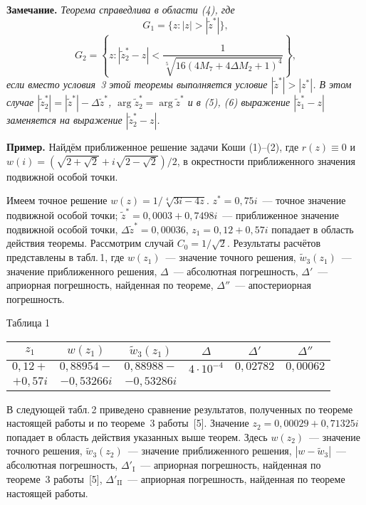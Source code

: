 \textbf{Замечание.} {\it Теорема справедлива в области (4), где
$$
G_{1} = \{ z\colon |z|> |\tilde z^{*}| \},
$$
$$
G_{2} = \left\{ z\colon |\tilde z_{2}^{*} -z| < \frac{1 }{\sqrt[\scriptstyle5]{16(4M_{7}+4\Delta
M_{2}+1)^{4}} } \right\},
$$
если вместо условия~3 этой теоремы выполняется условие $|\tilde z^{*}|> |z^{*}|$. В этом случае $|\tilde
z_{2}^{*}| = |\tilde z^{*}|- \Delta \tilde z^{*}$, $\arg \tilde z_{2}^{*} = \arg \tilde z^{*}$ и в (5), (6)
выражение $|\tilde z_{1}^{*}-z|$ заменяется на выражение $|\tilde z_{2}^{*}-z|$.}

\textbf{Пример.} Найдём приближенное решение задачи Коши (1)--(2), где $r(z)\equiv 0$ и $w(i) =
(\sqrt{2+\sqrt2}+i\sqrt{2-\sqrt2})/2$, в окрестности приближенного значения подвижной особой точки.

Имеем точное решение $w(z) = 1/\sqrt[\scriptstyle4]{3i-4z}$. $z^{*} = 0,75i$~--- точное значение подвижной
особой точки; $\tilde z^{*} = 0,0003+ 0,7498i$~--- приближенное значение подвижной особой точки, $\Delta
\tilde z^{*} = 0,00036$, $z_{1} = 0,12+0,57i$ попадает в область действия теоремы. Рассмотрим случай
$C_{0}=1/\sqrt2$. Результаты расчётов представлены в табл.\,1, где $w(z_{1})$~--- значение точного решения,
$\tilde w_{3}(z_{1})$~--- значение приближенного решения, $\Delta$~--- абсолютная погрешность, $\Delta'$~---
априорная погрешность, найденная по теореме, $\Delta''$~--- апостериорная погрешность.

\begin{table}[tb]
\footnotesize

{\raggedleft Таблица 1

}

\smallskip

{\tabcolsep=2.7mm

\bigskip

\begin{tabular}{|c|c|c|c|c|c|}
\hline
 $z_{1}$&$w(z_{1})$&$\tilde w_{3}(z_{1})$&$\Delta$&$\Delta'$&$\Delta''$\\
\hline
 $0,12+$&$0,88954-$&$0,88988-$&$4\cdot 10^{-4}$&$0,02782$&$0,00062$\\
 $+0,57i$&$-0,53266i$&$-0,53286i$&&&\\
\hline
\end{tabular}

}
\end{table}

В следующей табл.\,2 приведено сравнение результатов, полученных по теореме настоящей работы и по теореме~3
работы~[5]. Значение $z_{2} = 0,00029+ 0,71325i$ попадает в область действия указанных выше теорем. Здесь
$w(z_{2})$~--- значение точного решения, $\tilde w_{3}(z_{2})$~--- значение приближенного решения, $|w-\tilde
w_{3}|$~--- абсолютная погрешность, $\Delta'_{\mathrm{I}}$~--- априорная погрешность, найденная по теореме~3
работы~[5], $\Delta'_{\mathrm{II}}$~--- априорная погрешность, найденная по теореме настоящей \mbox{работы}.

